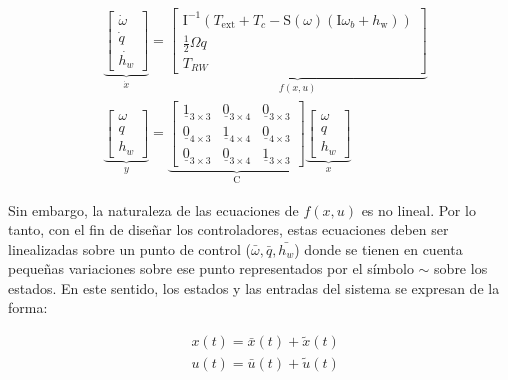 \begin{equation}\label{eq:espacio_estados_non}
	\begin{aligned}
		& \underbrace{\left[\begin{array}{c}
				\dot{\omega} \\
				\dot{q} \\
				\dot{h_{w}}
			\end{array}\right]}_{\dot{x}}=\underbrace{\left[\begin{array}{c}
				{\mathrm{I}}^{-1}\left(T_{\mathrm{ext}}+T_{c}-{\mathrm{S}}(\omega)\left({\mathrm{I}} \omega_{b}+h_{\mathrm{w}}\right)\right) \\
				\frac{1}{2} {\Omega} q \\
				T_{RW}
			\end{array}\right]}_{f(x,u)}\\[10pt]
		& \underbrace{\left[\begin{array}{c}
				\omega \\
				q \\
				h_{w}
			\end{array}\right]}_y=\underbrace{\left[\begin{array}{ccc}
				\underline{1}_{3 \times 3} & \underline{0}_{3 \times 4} & \underline{0}_{3 \times 3}\\
				\underline{0}_{4 \times 3} & \underline{1}_{4 \times 4} & \underline{0}_{4 \times 3} \\
				\underline{0}_{3 \times 3} & \underline{0}_{3 \times 4} & \underline{1}_{3 \times 3}
			\end{array}\right]}_{{\mathrm{C}}} \underbrace{\left[\begin{array}{c}
				\omega \\
				q \\
				h_{w}
			\end{array}\right]}_x
	\end{aligned}	
\end{equation}

Sin embargo, la naturaleza de las ecuaciones de $f(x,u)$ es no lineal. Por lo tanto, con el fin de diseñar los controladores, estas ecuaciones deben ser linealizadas sobre un punto de control ($\bar{\omega},\bar{q},\bar{h_w}$) donde se tienen en cuenta pequeñas variaciones sobre ese punto representados por el símbolo $\sim$ sobre los estados. En este sentido, los estados y las entradas del sistema se expresan de la forma: 

\begin{equation}
	\begin{aligned}
		& x(t) =\bar{x}(t)+ \tilde{x}(t) \\
		& u(t) =\bar{u}(t)+ \tilde{u}(t) 		
	\end{aligned}
\end{equation}	

